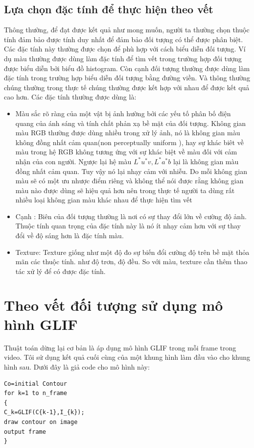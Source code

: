 \documentclass[12pt,oneside,a4]{report}
\begin{document}
\subsection{Lựa chọn đặc tính để thực hiện theo vết}
Thông thường, để đạt được kết quả như mong muốn, người ta thường chọn thuộc tính đảm bảo được tính duy nhất để đảm bảo đối tượng có thể được phân biệt. Các đặc tính này thường được chọn để phù hợp với cách biểu diễn đối tượng. Ví dụ màu thường được dùng làm đặc tính để tìm vết trong trường hợp đối tượng được biểu diễn bởi biểu đồ histogram. Còn cạnh đối tượng thường được dùng làm đặc tính trong trường hợp biểu diễn đối tượng bằng đường viền. Và thông thường chúng thường trong thực tế chúng thường được kết hợp với nhau để được kết quả cao hơn. Các đặc tính thường được dùng là:
\begin{itemize}

\item Màu sắc rõ ràng của một vật bị ảnh hường bởi các yếu tố  phân bố điện quang của ánh sáng và tính chất phản xạ bề mặt của đối tượng. Không gian màu RGB thường được dùng nhiều trong xử lý ảnh, nó là không gian màu không đồng nhất cảm quan(non perceptually uniform ), hay sự khác biêt về màu trong hệ RGB không tương ứng với sự khác biệt về màu đối với cảm nhận của con người. Ngược lại hệ màu $L^*u^*v, L^*a^*b$ lại là không gian màu đồng nhất cảm quan. Tuy vậy nó lại nhạy cảm với nhiễu. Do  mỗi không gian màu sẽ có một ưu nhược điểm riêng và không thể nói được rằng không gian màu nào được dùng sẽ hiệu quả hơn nên trong thực tế người ta dùng rất nhiều loại không gian màu khác nhau để thực hiện tìm vết
\item Cạnh : Biên của đối tượng thường là nơi có sự thay đổi lớn về cường độ ảnh. Thuộc tính quan trọng của đặc tính này là nó ít nhạy cảm hơn với sự thay đổi về độ sáng hơn là đặc tính màu. 

\item Texture: Texture giống như một độ đo sự biến đổi cường độ trên bề mặt thỏa mãn các thuộc tính. như độ trơn, độ đều. So với màu, texture cần thêm thao tác xử lý để có được đặc tính. 

\end{itemize}
\section{Theo vết đối tượng sử dụng mô hình GLIF}
Thuật toán dừng lại cơ bản là áp dụng mô hình GLIF trong mỗi frame trong video. Tôi sử dụng kết quả cuối cùng của một khung hình làm đầu vào cho khung hình sau. Dưới đây là giả code cho mô hình này:
\begin{lstlisting}
Co=initial Contour
for k=1 to n_frame 
{
C_k=GLIF(C{k-1},I_{k});
draw contour on image
output frame
}

\end{lstlisting}
\end{document}
